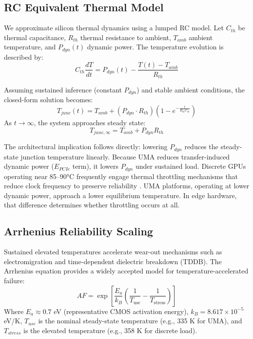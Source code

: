 \documentclass[conference]{IEEEtran}
\begin{document}
\subsection{RC Equivalent Thermal Model}
We approximate silicon thermal dynamics using a lumped RC model. Let $C_{th}$ be thermal capacitance, $R_{th}$ thermal resistance to ambient, $T_{amb}$ ambient temperature, and $P_{dyn}(t)$ dynamic power. The temperature evolution is described by:
\begin{equation}
C_{th} \frac{dT}{dt} = P_{dyn}(t) - \frac{T(t) - T_{amb}}{R_{th}}
\end{equation}

Assuming sustained inference (constant $P_{dyn}$) and stable ambient conditions, the closed-form solution becomes:
\begin{equation}
T_{junc}(t) = T_{amb} + (P_{dyn} \cdot R_{th})\left(1 - e^{-\frac{t}{R_{th}C_{th}}}\right)
\end{equation}
As $t \to \infty$, the system approaches steady state:
\begin{equation}
T_{junc,\infty} = T_{amb} + P_{dyn} R_{th}
\end{equation}

The architectural implication follows directly: lowering $P_{dyn}$ reduces the steady-state junction temperature linearly. Because UMA reduces transfer-induced dynamic power ($E_{PCIe}$ term), it lowers $P_{dyn}$ under sustained load. Discrete GPUs operating near 85–90°C frequently engage thermal throttling mechanisms that reduce clock frequency to preserve reliability \cite{b21}. UMA platforms, operating at lower dynamic power, approach a lower equilibrium temperature. In edge hardware, that difference determines whether throttling occurs at all.

\subsection{Arrhenius Reliability Scaling}
Sustained elevated temperatures accelerate wear-out mechanisms such as electromigration and time-dependent dielectric breakdown (TDDB). The Arrhenius equation provides a widely accepted model for temperature-accelerated failure:
\begin{equation}
AF = \exp\left[ \frac{E_a}{k_B} \left(\frac{1}{T_{\text{use}}} - \frac{1}{T_{\text{stress}}}\right) \right]
\end{equation}
Where $E_a \approx 0.7$ eV (representative CMOS activation energy), $k_B = 8.617 \times 10^{-5}$ eV/K, $T_{use}$ is the nominal steady-state temperature (e.g., 335 K for UMA), and $T_{stress}$ is the elevated temperature (e.g., 358 K for discrete load).
\end{document}
